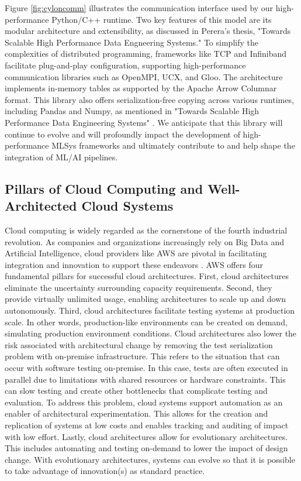 \documentclass[conference]{IEEEtran}
\begin{document}
Figure \ref{fig:cyloncomm} illustrates the communication interface used by our high-performance Python/C++ runtime. Two key features of this model are its modular architecture and extensibility, as discussed in Perera's thesis, "Towards Scalable High Performance Data Engneering Systems."  To simplify the complexities of distributed programming, frameworks like TCP and Infiniband facilitate plug-and-play configuration, supporting high-performance communication libraries such as OpenMPI, UCX, and Gloo. The architecture implements in-memory tables as supported by the Apache Arrow Columnar format. This library also offers serialization-free copying across various runtimes, including Pandas and Numpy, as mentioned in "Towards Scalable High Performance Data Engineering Systems" \cite{pererathesis}. We anticipate that this library will continue to evolve and will profoundly impact the development of high-performance MLSys frameworks and ultimately contribute to and help shape the integration of ML/AI pipelines. 

\subsection{Pillars of Cloud Computing and Well-Architected Cloud Systems}
Cloud computing is widely regarded as the cornerstone of the fourth industrial revolution. As companies and organizations increasingly rely on Big Data and Artificial Intelligence, cloud providers like AWS are pivotal in facilitating integration and innovation to support these endeavors \cite{hashemipour2020amazon}. AWS offers four fundamental pillars for successful cloud architectures. First, cloud architectures eliminate the uncertainty surrounding capacity requirements. Second, they provide virtually unlimited usage, enabling architectures to scale up and down autonomously. Third, cloud architectures facilitate testing systems at production scale. In other words, production-like environments can be created on demand, simulating production environment conditions. Cloud architectures also lower the risk associated with architectural change by removing the test serialization problem with on-premise infrastructure.  This refers to the situation that can occur with software testing on-premise.  In this case, tests are often executed in parallel due to limitations with shared resources or hardware constraints.  This can slow testing and create other bottlenecks that complicate testing and evaluation.  To address this problem, cloud systems support automation as an enabler of architectural experimentation. This allows for the creation and replication of systems at low costs and enables tracking and auditing of impact with low effort.  Lastly, cloud architectures allow for evolutionary architectures.  This includes automating and testing on-demand to lower the impact of design change.  With evolutionary architectures, systems can evolve so that it is possible to take advantage of innovation(s) as standard practice\cite{aws_well_architected_framework}.
\end{document}
